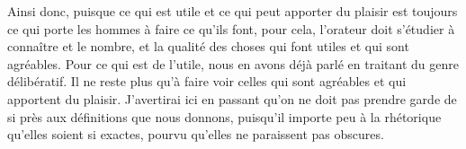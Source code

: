 \bigbreak

Ainsi donc, puisque ce qui est utile et ce qui peut apporter du plaisir est toujours ce qui porte les hommes à faire ce qu'ils
font, pour cela, l'orateur doit s'étudier à connaître et le nombre, et la qualité des choses qui font utiles et qui sont
agréables. Pour ce qui est de l'utile, nous en avons déjà parlé en traitant du genre délibératif. Il ne reste plus qu'à faire
voir celles qui sont agréables et qui apportent du plaisir. J'avertirai ici en passant qu'on ne doit pas prendre garde de si
près aux définitions que nous donnons, puisqu'il importe peu à la rhétorique qu'elles soient si exactes, pourvu qu'elles ne
paraissent pas obscures. 
